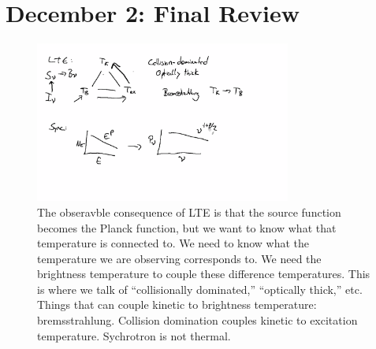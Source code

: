 \documentclass{article}
\begin{document}
\section{December 2: Final Review}

\begin{figure}
    \centering
    \includegraphics[width=0.75\textwidth]{figures/Screen Shot 2020-12-03 at 11.20.51 AM.png}
    \caption{The obseravble consequence of LTE is that the source function becomes the Planck function, but we want to know what that temperature is connected to. We need to know what the temperature we are observing corresponds to. We need the brightness temperature to couple these difference temperatures. This is where we talk of ``collisionally dominated,'' ``optically thick,'' etc. Things that can couple kinetic to brightness temperature: bremsstrahlung. Collision domination couples kinetic to excitation temperature. Sychrotron is not thermal. }
    \label{fig:rev1}
\end{figure}
\end{document}
